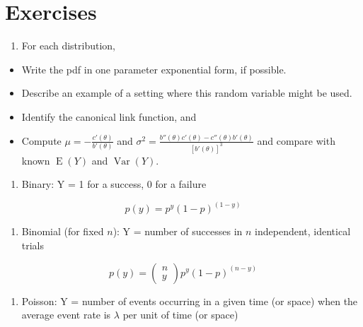 \documentclass[
]{krantz}
\providecommand{\tightlist}{%
  \setlength{\itemsep}{0pt}\setlength{\parskip}{0pt}}
\newcommand{\E}{\operatorname{E}}
\newcommand{\var}{\operatorname{Var}}
\begin{document}
\hypertarget{exercises-4}{%
\section{Exercises}\label{exercises-4}}

\begin{enumerate}
\def\labelenumi{\arabic{enumi}.}
\tightlist
\item
  For each distribution,
\end{enumerate}

\begin{itemize}
\tightlist
\item
  Write the pdf in one parameter exponential form, if possible.
\item
  Describe an example of a setting where this random variable might be used.
\item
  Identify the canonical link function, and
\item
  Compute \(\mu = -\frac{c'(\theta)}{b'(\theta)}\) and \(\sigma^2 = \frac{b''(\theta)c'(\theta)-c''(\theta)b'(\theta)}{[b'(\theta)]^3}\) and compare with known \(\E(Y)\) and \(\var(Y)\).
\end{itemize}

\begin{enumerate}
\def\labelenumi{\alph{enumi})}
\tightlist
\item
  Binary: Y = 1 for a success, 0 for a failure
\end{enumerate}

\[p(y)=p^{y}(1-p)^{(1-y)}
  \]

\begin{enumerate}
\def\labelenumi{\alph{enumi})}
\setcounter{enumi}{1}
\tightlist
\item
  Binomial (for fixed \(n\)): Y = number of successes in \(n\) independent, identical trials
\end{enumerate}

\[p(y)=\left(\begin{array} {c}  n\\y  \end{array}\right) p^y(1-p)^{(n-y)}
  \]

\begin{enumerate}
\def\labelenumi{\alph{enumi})}
\setcounter{enumi}{2}
\tightlist
\item
  Poisson: Y = number of events occurring in a given time (or space) when the average event rate is \(\lambda\) per unit of time (or space)
\end{enumerate}
\end{document}
